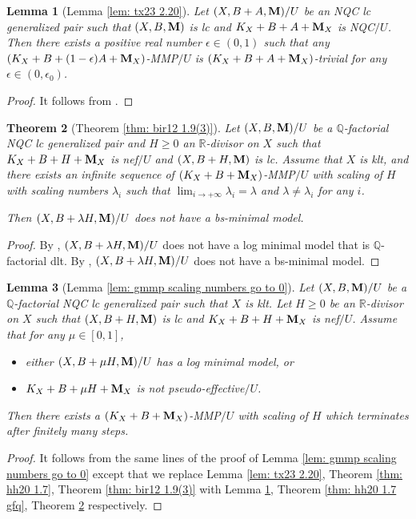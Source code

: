 \documentclass[11pt]{amsart}
\numberwithin{equation}{section}
\newcommand{\Mm}{{\bf{M}}}
\newcommand{\Qq}{\mathbb{Q}}
\newcommand{\Rr}{\mathbb{R}}
\newtheorem{thm}{Theorem}[section]
\newtheorem{lem}[thm]{Lemma}
\theoremstyle{definition}
\theoremstyle{definition}
\theoremstyle{definition}
\begin{document}
\begin{lem}[Lemma \ref{lem: tx23 2.20}]\label{lem: tx23 2.20 gfq}
    Let $(X,B+A,\Mm)/U$ be an NQC lc generalized pair such that $(X,B,\Mm)$ is lc and $K_X+B+A+\Mm_X$ is NQC$/U$. Then there exists a positive real number $\epsilon\in (0,1)$ such that any $(K_X+B+(1-\epsilon)A+\Mm_X)$-MMP$/U$ is $(K_X+B+A+\Mm_X)$-trivial for any $\epsilon\in (0,\epsilon_0)$.
\end{lem}
\begin{proof}
    It follows from \cite[Lemma 2.20]{TX23}.
\end{proof}

\begin{thm}[Theorem \ref{thm: bir12 1.9(3)}]\label{thm: bir12 1.9(3) gfq}
     Let $(X,B,\Mm)/U$ be a $\Qq$-factorial NQC lc generalized pair and $H\geq 0$ an $\Rr$-divisor on $X$ such that $K_X+B+H+\Mm_X$ is nef$/U$ and $(X,B+H,\Mm)$ is lc. Assume that $X$ is klt, and there exists an infinite sequence of $(K_X+B+\Mm_X)$-MMP$/U$ with scaling of $H$ with scaling numbers $\lambda_i$ such that $\lim_{i\rightarrow+\infty}\lambda_i=\lambda$ and $\lambda\not=\lambda_i$ for any $i$.
     
     Then $(X,B+\lambda H,\Mm)/U$ does not have a bs-minimal model.
\end{thm}
\begin{proof}
    By \cite[Theorem 4.1]{HL22}, $(X,B+\lambda H,\Mm)/U$ does not have a log minimal model that is $\Qq$-factorial dlt. By \cite[Lemma 3.8]{HL23}, $(X,B+\lambda H,\Mm)/U$ does not have a  bs-minimal model.
\end{proof}


\begin{lem}[Lemma \ref{lem: gmmp scaling numbers go to 0}]\label{lem: gmmp scaling numbers go to 0 gfq}
Let $(X,B,\Mm)/U$ be a $\Qq$-factorial NQC lc generalized pair such that $X$ is klt. Let $H\geq 0$ be an $\Rr$-divisor on $X$ such that $(X,B+H,\Mm)$ is lc and $K_X+B+H+\Mm_X$ is nef$/U$. Assume that for any $\mu\in [0,1]$,
\begin{itemize}
    \item either $(X,B+\mu H,\Mm)/U$ has a log minimal model, or
    \item $K_X+B+\mu H+\Mm_X$ is not pseudo-effective$/U$.
\end{itemize}
Then there exists a $(K_X+B+\Mm_X)$-MMP$/U$ with scaling of $H$ which terminates after finitely many steps.
\end{lem}
\begin{proof}
  It follows from the same lines of the proof of Lemma \ref{lem: gmmp scaling numbers go to 0} except that we replace Lemma \ref{lem: tx23 2.20}, Theorem \ref{thm: hh20 1.7},  Theorem \ref{thm: bir12 1.9(3)} with Lemma \ref{lem: tx23 2.20 gfq}, Theorem \ref{thm: hh20 1.7 gfq},  Theorem \ref{thm: bir12 1.9(3) gfq} respectively.
\end{proof}
\end{document}
